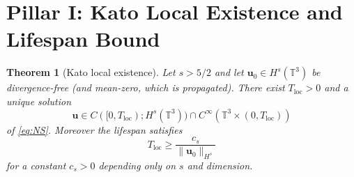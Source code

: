 \documentclass[11pt,a4paper]{article}
\newtheorem{theorem}{Theorem}[section]
\begin{document}
\section{Pillar I: Kato Local Existence and Lifespan Bound}

\begin{theorem}[Kato local existence]\label{thm:kato}
Let \(s>5/2\) and let \(\mathbf{u}_0\in H^s(\mathbb{T}^3)\) be divergence-free (and mean-zero, which is propagated). There exist \(T_{\mathrm{loc}}>0\) and a unique solution
\[
\mathbf{u}\in C([0,T_{\mathrm{loc}});H^s(\mathbb{T}^3))\cap C^\infty(\mathbb{T}^3\times(0,T_{\mathrm{loc}}))
\]
of \eqref{eq:NS}. Moreover the lifespan satisfies
\[
T_{\mathrm{loc}}\ge\frac{c_s}{\|\mathbf{u}_0\|_{H^s}}
\]
for a constant \(c_s>0\) depending only on \(s\) and dimension.
\end{theorem}
\end{document}
